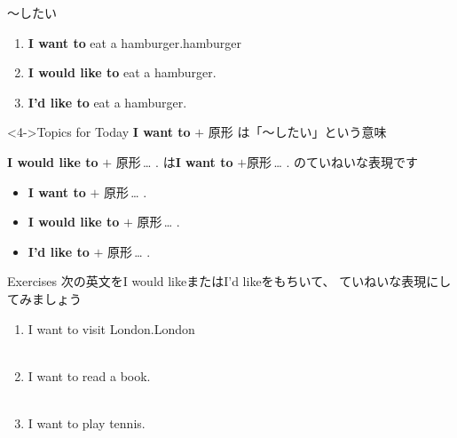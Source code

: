 \documentclass[aspectratio=169,xcolor={dvipsnames,table}]{beamer}
\begin{document}
\begin{frame}[plain]{～したい}
\large
 \begin{enumerate}
  \item<1-> \textbf{I want to} eat a hamburger.\hfill{\scriptsize hamburger }
  \item<2-> \textbf{I would like to} eat a hamburger.
  \item<3-> {\bfseries I'd like to} eat a hamburger.
 \end{enumerate}

\begin{block}<4->{Topics for Today}\small
\textbf{I want to} $+$ 原形\,\,は「～したい」という意味

\textbf{I would like to} $+$ 原形\,\ldots\,\,.\,\,は\textbf{I want to} $+$原形\,\ldots\,\,.\,\,のていねいな表現です
\begin{itemize}[square]\small
 \item \textbf{I want to} $+$ 原形\,\ldots\,\,.
 \item \textbf{I would like to} $+$ 原形\,\ldots\,\,.
 \item \textbf{I'd like to} $+$ 原形\,\ldots\,\,.
       \end{itemize}
\end{block}

\hfill{\scriptsize {}}

\end{frame}
\begin{frame}[plain]{Exercises}
次の英文をI would likeまたはI'd likeをもちいて、 ていねいな表現にしてみましょう
 \begin{enumerate}
  \item I want to visit London.\hfill{\scriptsize London }\\
\\
  \item I want to read a book.\\
\\
  \item I want to play tennis.\\
\\
 \end{enumerate}
\hfill{\scriptsize {}}

\end{frame}
\end{document}
